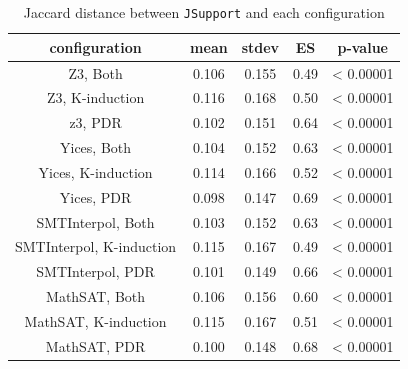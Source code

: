 \begin{table}
  \centering
  \begin{tabular}{|c|c|c|c|c|}
    \hline
    configuration & mean & stdev & ES & p-value \\[0.5ex]
    \hline\hline
    Z3, Both  & 0.106 & 0.155 & 0.49 & < 0.00001\\[0.5ex] %
    Z3, K-induction & 0.116 & 0.168 & 0.50 & < 0.00001\\[0.5ex]
    z3, PDR  & 0.102 & 0.151 & 0.64 & < 0.00001\\[0.5ex]
    \hline
    Yices, Both & 0.104 & 0.152 & 0.63& < 0.00001 \\[0.5ex]
    Yices, K-induction  & 0.114 & 0.166 & 0.52 & < 0.00001 \\[0.5ex]
    Yices, PDR  & 0.098 & 0.147 & 0.69 & < 0.00001\\[0.5ex]
    \hline
    SMTInterpol, Both  & 0.103 & 0.152 & 0.63 & < 0.00001\\[0.5ex]
    SMTInterpol, K-induction  & 0.115 & 0.167 & 0.49 & < 0.00001\\[0.5ex]
    SMTInterpol, PDR  & 0.101 & 0.149 & 0.66 & < 0.00001\\[0.5ex]
    \hline
    MathSAT, Both  & 0.106 & 0.156 & 0.60 & < 0.00001\\[0.5ex]
    MathSAT, K-induction & 0.115 & 0.167 &0.51 & < 0.00001\\[0.5ex]
    MathSAT, PDR & 0.100 & 0.148 & 0.68  &< 0.00001\\[0.5ex]
    \hline
  \end{tabular}
  \caption{Jaccard distance between \texttt{JSupport} and each configuration}\label{tab:jsupconf}
\end{table}

\vspace{6pt}
\noindent{}
 \vspace{6pt}

